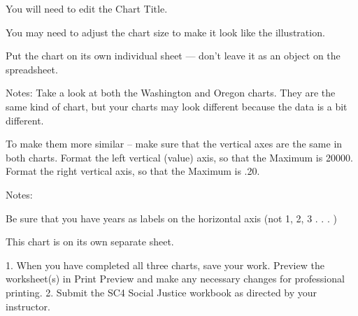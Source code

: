 You will need to edit the Chart Title.

You may need to adjust the chart size to make it look like the illustration.

Put the chart on its own individual sheet — don’t leave it as an object on the spreadsheet.





Notes:
Take a look at both the Washington and Oregon charts. They are the same kind of chart, but your charts may look
different because the data is a bit different.

To make them more similar – make sure that the vertical axes are the same in both charts. Format the left vertical
(value) axis, so that the Maximum is 20000. Format the right vertical axis, so that the Maximum is .20.




Notes:

Be sure that you have years as labels on the horizontal axis (not 1, 2, 3 . . . )

This chart is on its own separate sheet.




1. When you have completed all three charts, save your work. Preview the worksheet(s) in Print
Preview and make any necessary changes for professional printing.
2. Submit the SC4 Social Justice workbook as directed by your instructor.


